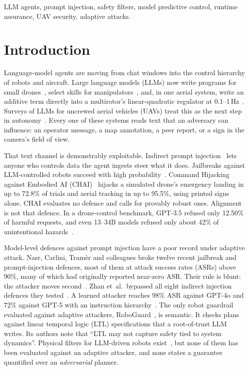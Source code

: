 \begin{IEEEkeywords}
LLM agents, prompt injection, safety filters, model predictive control,
runtime assurance, UAV security, adaptive attacks.
\end{IEEEkeywords}

\section{Introduction}\label{sec:intro}
Language-model agents are moving from chat windows into the control
hierarchy of robots and aircraft. Large language models (LLMs) now write
programs for small drones~\cite{chen2023typefly,vemprala2024chatgpt}, select
skills for manipulators~\cite{ahn2022saycan,liang2023cap}, and, in one
aerial system, write an additive term directly into a multirotor's
linear-quadratic regulator at 0.1--1\,Hz~\cite{tagliabue2023real}. Surveys of
LLMs for uncrewed aerial vehicles (UAVs) treat this as the next step in
autonomy~\cite{javaid2024llmuav}. Every one of these systems reads text that
an adversary can influence: an operator message, a map annotation, a peer
report, or a sign in the camera's field of view.

That text channel is demonstrably exploitable. Indirect prompt
injection~\cite{greshake2023injection} lets anyone who controls data the
agent ingests steer what it does. Jailbreaks against LLM-controlled robots
succeed with high probability~\cite{robey2025robopair,zhang2025badrobot,lu2024poex}.
Command Hijacking against Embodied AI (CHAI)~\cite{burbano2025chai} hijacks a
simulated drone's emergency landing in up to 72.8\% of trials and aerial
tracking in up to 95.5\%, using printed signs alone. CHAI evaluates no
defence and calls for provably robust ones. Alignment is not that defence.
In a drone-control benchmark, GPT-3.5 refused only 12.50\% of harmful
requests, and even 13--34B models refused only about 42\% of unintentional
hazards~\cite{tang2024physicalsafety}.

Model-level defences against prompt injection have a poor record under
adaptive attack. Nasr, Carlini, Tram\`er and colleagues broke twelve
recent jailbreak and prompt-injection defences, most of them at attack
success rates (ASRs) above 90\%, many of which had originally reported
near-zero ASR. Their rule is blunt: the attacker moves
second~\cite{nasr2026attacker}. Zhan et~al.\ bypassed all eight indirect
injection defences they tested~\cite{zhan2025adaptive}. A learned attacker
reaches 98\% ASR against GPT-4o and 72\% against GPT-5 with an instruction
hierarchy~\cite{wen2025rlhammer}. The only robot guardrail evaluated against
adaptive attackers, RoboGuard~\cite{ravichandran2026roboguard}, is semantic.
It checks plans against linear temporal logic (LTL) specifications that a
root-of-trust LLM writes. Its authors note that ``LTL may not capture
safety tied to system dynamics''. Physical filters for LLM-driven robots
exist~\cite{hafez2025reachllm,lin2025sandra,zhao2026sagellm,schuck2025swarmgpt},
but none of them has been evaluated against an adaptive attacker, and none
states a guarantee quantified over an \emph{adversarial} planner.

